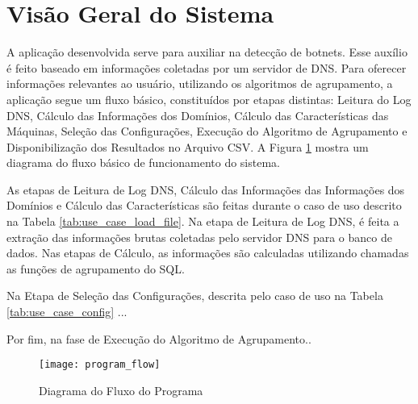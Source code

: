 \section{Visão Geral do Sistema}
A aplicação desenvolvida serve para auxiliar na detecção de botnets. Esse auxílio é feito baseado em informações coletadas por um servidor de DNS. Para oferecer informações relevantes ao usuário, utilizando os algoritmos de agrupamento, a aplicação segue um fluxo básico, constituídos por etapas distintas: Leitura do Log DNS, Cálculo das Informações dos Domínios, Cálculo das Características das Máquinas, Seleção das Configurações, Execução do Algoritmo de Agrupamento e Disponibilização dos Resultados no Arquivo CSV. A Figura \ref{fig:program_flow} mostra um diagrama do fluxo básico de funcionamento do sistema.

As etapas de Leitura de Log DNS, Cálculo das Informações das Informações dos Domínios e Cálculo das Características são feitas durante o caso de uso descrito na Tabela \ref{tab:use_case_load_file}. Na etapa de Leitura de Log DNS, é feita a extração das informações brutas coletadas pelo servidor DNS para o banco de dados. Nas etapas de Cálculo, as informações são calculadas utilizando chamadas as funções de agrupamento do SQL.

Na Etapa de Seleção das Configurações, descrita pelo caso de uso na Tabela \ref{tab:use_case_config} ...

Por fim, na fase de Execução do Algoritmo de Agrupamento..


\begin{figure}
\centering
\texttt{[image: program\_flow]}
\caption[Diagram do Fluxo do Programa]{Diagrama do Fluxo do Programa} \label{fig:program_flow}
\end{figure}

